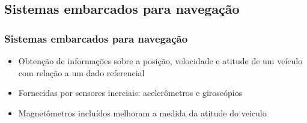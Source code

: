 \documentclass{beamer}
\begin{document}
\subsection*{Sistemas embarcados para navegação}
\begin{frame}
	
	\frametitle{Sistemas embarcados para navegação}
	
	\begin{itemize}

	\item Obtenção de informações sobre a posição, velocidade e atitude de um veículo com relação a um dado referencial	
	
	\item Fornecidas por sensores inerciais: acelerômetros e giroscópios
	
	\item Magnetômetros incluídos melhoram a medida da atitude do veiculo	
	
	\end{itemize}
	
\end{frame}	
\end{document}
